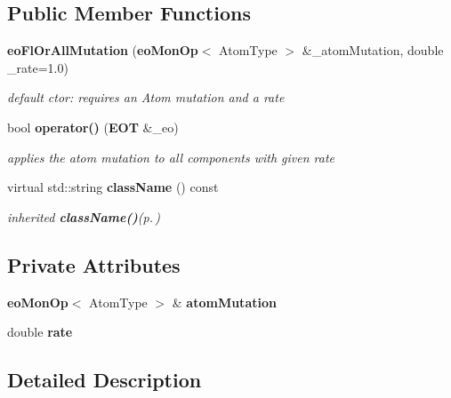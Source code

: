 \subsection*{Public Member Functions}
\begin{CompactItemize}
\item 
{\bf eo\-Fl\-Or\-All\-Mutation} ({\bf eo\-Mon\-Op}$<$ Atom\-Type $>$ \&\_\-atom\-Mutation, double \_\-rate=1.0)\label{classeo_fl_or_all_mutation_a0}

\begin{CompactList}\small\item\em default ctor: requires an Atom mutation and a rate \item\end{CompactList}\item 
bool {\bf operator()} ({\bf EOT} \&\_\-eo)\label{classeo_fl_or_all_mutation_a1}

\begin{CompactList}\small\item\em applies the atom mutation to all components with given rate \item\end{CompactList}\item 
virtual std::string {\bf class\-Name} () const \label{classeo_fl_or_all_mutation_a2}

\begin{CompactList}\small\item\em inherited {\bf class\-Name()}{\rm (p.\,\pageref{classeo_fl_or_all_mutation_a2})} \item\end{CompactList}\end{CompactItemize}
\subsection*{Private Attributes}
\begin{CompactItemize}
\item 
{\bf eo\-Mon\-Op}$<$ Atom\-Type $>$ \& {\bf atom\-Mutation}\label{classeo_fl_or_all_mutation_r0}

\item 
double {\bf rate}\label{classeo_fl_or_all_mutation_r1}

\end{CompactItemize}


\subsection{Detailed Description}
